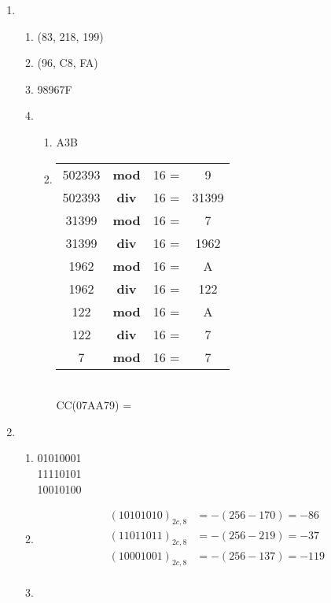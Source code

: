 \documentclass{article}
\begin{document}
\begin{enumerate}
	\item
	      \begin{enumerate}
		      \item (83, 218, 199)
		      \item (96, C8, FA)
		      \item 98967F
		      \item \begin{enumerate}
			            \item A3B \\
			            \item %
			                  \begin{tabular}{cccc}
				                  502393 & \textbf{mod} & 16  = & 9     \\
				                  502393 & \textbf{div} & 16  = & 31399 \\
				                  31399  & \textbf{mod} & 16  = & 7     \\
				                  31399  & \textbf{div} & 16  = & 1962  \\
				                  1962   & \textbf{mod} & 16  = & A     \\
				                  1962   & \textbf{div} & 16  = & 122   \\
				                  122    & \textbf{mod} & 16  = & A     \\
				                  122    & \textbf{div} & 16  = & 7     \\
				                  7      & \textbf{mod} & 16  = & 7     \\
			                  \end{tabular} \\
			                  CC(07AA79) =  \\
		            \end{enumerate}
	      \end{enumerate}

	\item \begin{enumerate}
		      \item
		            01010001  \\
		            11110101\\
		            10010100\\
		      \item
		            \begin{align*}
			            (10101010)_{2c,8} & = -(256 - 170) = -86  \\
			            (11011011)_{2c,8} & = -(256 - 219) = -37  \\
			            (10001001)_{2c,8} & = -(256 - 137) = -119 \\
		            \end{align*}
		      \item \begin{enumerate}


\end{enumerate}
\end{enumerate}
\end{enumerate}
\end{document}
